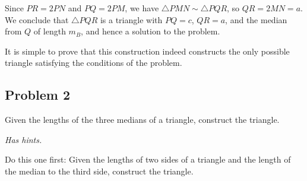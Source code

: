 \begin{mdsoln}
Since $PR = 2PN$ and $PQ = 2PM$, we have $\triangle PMN\sim \triangle PQR$, so $QR = 2MN = a$. We conclude that $\triangle PQR$ is a triangle with $PQ = c$, $QR = a$, and the median from $Q$ of length $m_B$, and hence a solution to the problem.

It is simple to prove that this construction indeed constructs the only possible triangle satisfying the conditions of the problem.

\end{mdsoln}
\subsection{Problem 2}

Given the lengths of the three medians of a triangle, construct the triangle.

\textit{Has hints.}
\begin{sketch}
    Do this one first: Given the lengths of two sides of a triangle and the length of the median to the third side, construct the triangle.    
\end{sketch}

